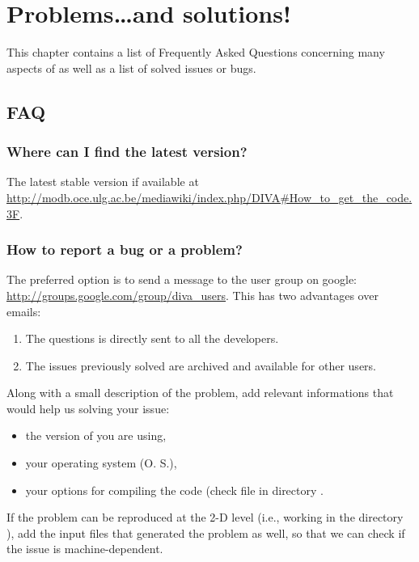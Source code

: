 \chapter{Problems\ldots and solutions!}

This chapter contains a list of Frequently Asked Questions concerning many aspects of \diva as well as a list of solved issues or bugs.

\minitoc


\section{FAQ}

\subsection{Where can I find the latest version?}

The latest stable version if available at \url{http://modb.oce.ulg.ac.be/mediawiki/index.php/DIVA#How_to_get_the_code.3F}. 


\subsection{How to report a bug or a problem?}

The preferred option is to send a message to the \diva user group on google: \url{http://groups.google.com/group/diva_users}. 
This has two advantages over emails:
\begin{enumerate}
\item The questions is directly sent to all the \diva developers.
\item The issues previously solved are archived and available for other users.
\end{enumerate}

Along with a small description of the problem, add relevant informations that would help us solving your issue:
\begin{itemize}
\item the version of \diva you are using,
\item your operating system (O. S.),
\item your options for compiling the code (check file  in directory .
\end{itemize}
If the problem can be reproduced at the 2-D level (i.e., working in the directory ), add the input files that generated the problem as well, so that we can check if the issue is machine-dependent. 

